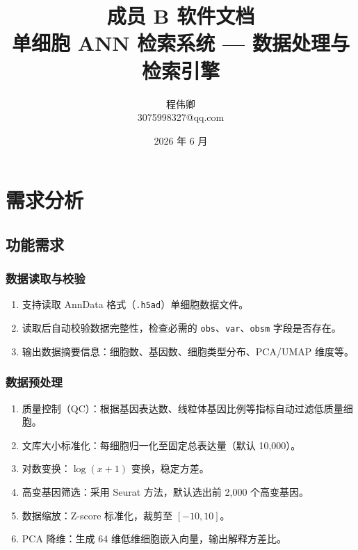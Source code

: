 \documentclass[12pt,a4paper]{ctexart}
\title{\textbf{成员 B 软件文档} \\[4pt]
       \large 单细胞 ANN 检索系统 — 数据处理与检索引擎}
\author{程伟卿 \quad 2311865 \\[4pt] 3075998327@qq.com}
\date{2026 年 6 月}
\begin{document}
\maketitle
\tableofcontents
\newpage

\section{需求分析}

\subsection{功能需求}

\subsubsection{数据读取与校验}

\begin{enumerate}[label=FR-\arabic*:,leftmargin=*]
    \item 支持读取 AnnData 格式（\texttt{.h5ad}）单细胞数据文件。
    \item 读取后自动校验数据完整性，检查必需的 \texttt{obs}、\texttt{var}、\texttt{obsm} 字段是否存在。
    \item 输出数据摘要信息：细胞数、基因数、细胞类型分布、PCA/UMAP 维度等。
\end{enumerate}

\subsubsection{数据预处理}

\begin{enumerate}[label=FR-\arabic*:,leftmargin=*,resume]
    \item 质量控制（QC）：根据基因表达数、线粒体基因比例等指标自动过滤低质量细胞。
    \item 文库大小标准化：每细胞归一化至固定总表达量（默认 10,000）。
    \item 对数变换：$\log(x+1)$ 变换，稳定方差。
    \item 高变基因筛选：采用 Seurat 方法，默认选出前 2,000 个高变基因。
    \item 数据缩放：Z-score 标准化，裁剪至 $[-10, 10]$。
    \item PCA 降维：生成 64 维低维细胞嵌入向量，输出解释方差比。
\end{enumerate}
\end{document}
